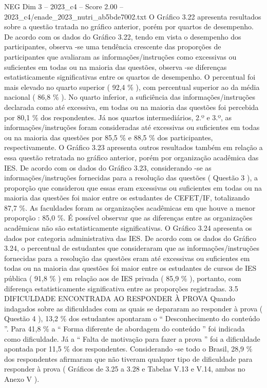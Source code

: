 \begin{textsample}{NEG Dim 3 – 2023\_c4 – Score 2.00 – 2023\_c4/enade\_2023\_nutri\_ab5bde7002.txt}
O Gráfico 3.22 apresenta resultados sobre a questão tratada no gráfico anterior, porém por quartos de desempenho.
De acordo com os dados do Gráfico 3.22, tendo em vista o desempenho dos participantes, observa -se uma tendência crescente das proporções de participantes que avaliaram as informações/instruções como excessivas ou suficientes em todas ou na maioria das questões, observa -se diferenças estatisticamente significativas entre os quartos de desempenho.
O percentual foi mais elevado no quarto superior ( 92,4 \% ), com percentual superior ao da média nacional ( 86,8 \% ).
No quarto inferior, a suficiência das informações/instruções declarada como até excessiva, em todas ou na maioria das questões foi percebida por 80,1 \% dos respondentes.
Já nos quartos intermediários, 2.º e 3.º, as informações/instruções foram consideradas até excessivas ou suficientes em todas ou na maioria das questões por 85,5 \% e 88,5 \% dos participantes, respectivamente.
O Gráfico 3.23 apresenta outros resultados também em relação a essa questão retratada no gráfico anterior, porém por organização acadêmica das IES.
De acordo com os dados do Gráfico 3.23, considerando -se as informações/instruções fornecidas para a resolução das questões ( Questão 3 ), a proporção que considerou que essas eram excessivas ou suficientes em todas ou na maioria das questões foi maior entre os estudantes de CEFET/IF, totalizando 87,7 \%.
As faculdades foram as organizações acadêmicas em que houve a menor proporção : 85,0 \%.
É possível observar que as diferenças entre as organizações acadêmicas não são estatisticamente significativas.
O Gráfico 3.24 apresenta os dados por categoria administrativa das IES.
De acordo com os dados do Gráfico 3.24, o percentual de estudantes que consideraram que as informações/instruções fornecidas para a resolução das questões eram até excessivas ou suficientes em todas ou na maioria das questões foi maior entre os estudantes de cursos de IES pública ( 91,8 \% ) em relação aos de IES privada ( 85,9 \% ), portanto, com diferença estatisticamente significativa entre as proporções registradas. 3.5 DIFICULDADE ENCONTRADA AO RESPONDER À PROVA Quando indagados sobre as dificuldades com as quais se depararam ao responder à prova ( Questão 4 ), 13,2 \% dos estudantes apontaram o “ Desconhecimento do conteúdo ”.
Para 41,8 \% a “ Forma diferente de abordagem do conteúdo ” foi indicada como dificuldade.
Já a “ Falta de motivação para fazer a prova ” foi a dificuldade apontada por 11,5 \% dos respondentes.
Considerando -se todo o Brasil, 28,9 \% dos respondentes afirmaram que não tiveram qualquer tipo de dificuldade para responder à prova ( Gráficos de 3.25 a 3.28 e Tabelas V.13 e V.14, ambas no Anexo V ).

\end{textsample}
